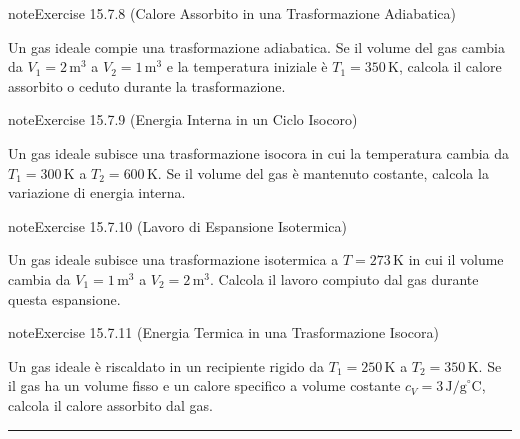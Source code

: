 \documentclass[letterpaper,10pt,italian]{jupyterBook}
\begin{document}
\begin{sphinxadmonition}{note}{Exercise 15.7.8 (Calore Assorbito in una Trasformazione Adiabatica)}



\sphinxAtStartPar
Un gas ideale compie una trasformazione adiabatica. Se il volume del gas cambia da \(V_1 = 2 \, \text{m}^3\) a \(V_2 = 1 \, \text{m}^3\) e la temperatura iniziale è \(T_1 = 350 \, \text{K}\), calcola il calore assorbito o ceduto durante la trasformazione.
\end{sphinxadmonition}
 \label{exercise:ch/thermodynamics/principles-problems-exercise-8}

\begin{sphinxadmonition}{note}{Exercise 15.7.9 (Energia Interna in un Ciclo Isocoro)}



\sphinxAtStartPar
Un gas ideale subisce una trasformazione isocora in cui la temperatura cambia da \(T_1 = 300 \, \text{K}\) a \(T_2 = 600 \, \text{K}\). Se il volume del gas è mantenuto costante, calcola la variazione di energia interna.
\end{sphinxadmonition}
 \label{exercise:ch/thermodynamics/principles-problems-exercise-9}

\begin{sphinxadmonition}{note}{Exercise 15.7.10 (Lavoro di Espansione Isotermica)}



\sphinxAtStartPar
Un gas ideale subisce una trasformazione isotermica a \(T = 273 \, \text{K}\) in cui il volume cambia da \(V_1 = 1 \, \text{m}^3\) a \(V_2 = 2 \, \text{m}^3\). Calcola il lavoro compiuto dal gas durante questa espansione.
\end{sphinxadmonition}
 \label{exercise:ch/thermodynamics/principles-problems-exercise-10}

\begin{sphinxadmonition}{note}{Exercise 15.7.11 (Energia Termica in una Trasformazione Isocora)}



\sphinxAtStartPar
Un gas ideale è riscaldato in un recipiente rigido da \(T_1 = 250 \, \text{K}\) a \(T_2 = 350 \, \text{K}\). Se il gas ha un volume fisso e un calore specifico a volume costante \(c_V = 3 \, \text{J/g}^\circ \text{C}\), calcola il calore assorbito dal gas.
\end{sphinxadmonition}


\bigskip\hrule\bigskip
\end{document}
